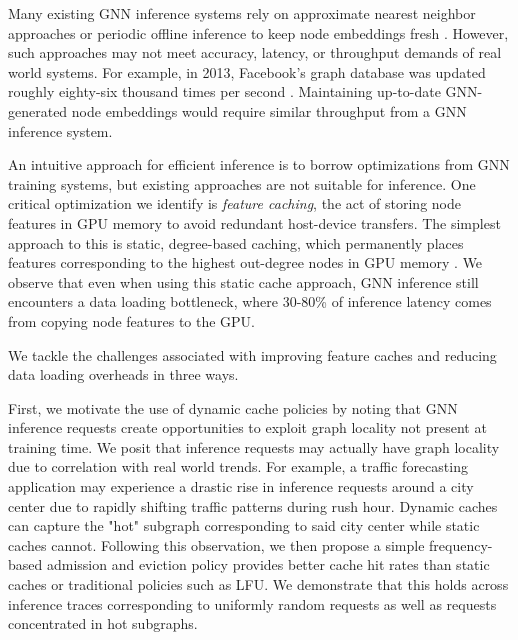 Many existing GNN inference systems rely on approximate nearest neighbor approaches or periodic offline inference to keep node embeddings fresh \cite{Recsys_PinSAGE_2018} \cite{Recsys_Survey_2022}. However, such approaches may not meet accuracy, latency, or throughput demands of real world systems. For example, in 2013, Facebook's graph database was updated roughly eighty-six thousand times per second \cite{Graph_Survey_2020}. Maintaining up-to-date GNN-generated node embeddings would require similar throughput from a GNN inference system.

An intuitive approach for efficient inference is to borrow optimizations from GNN training systems, but existing approaches are not suitable for inference. One critical optimization we identify is \textit{feature caching}, the act of storing node features in GPU memory to avoid redundant host-device transfers.
The simplest approach to this is static, degree-based caching, which permanently places features corresponding to the highest out-degree nodes in GPU memory \cite{PaGraph_2020}.
We observe that even when using this static cache approach, GNN inference still encounters a data loading bottleneck, where 30-80\% of inference latency comes from copying node features to the GPU.

We tackle the challenges associated with improving feature caches and reducing data loading overheads in three ways.

First, we motivate the use of dynamic cache policies by noting that GNN inference requests create opportunities to exploit graph locality not present at training time. We posit that inference requests may actually have graph locality due to correlation with real world trends. For example, a traffic forecasting application may experience a drastic rise in inference requests around a city center due to rapidly shifting traffic patterns during rush hour. Dynamic caches can capture the "hot" subgraph corresponding to said city center while static caches cannot. Following this observation, we then propose a simple frequency-based admission and eviction policy provides better cache hit rates than static caches or traditional policies such as LFU. We demonstrate that this holds across inference traces corresponding to uniformly random requests as well as requests concentrated in hot subgraphs.


